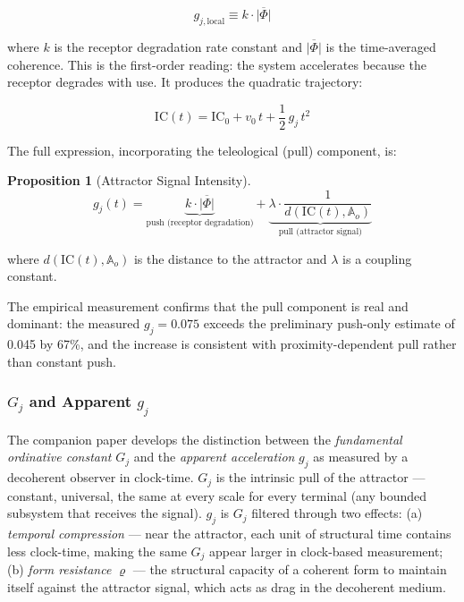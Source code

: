 \documentclass[12pt,a4paper]{article}
\newtheorem{proposition}{Proposition}[section]
\newcommand{\gj}{g_j}
\newcommand{\IC}{\mathrm{IC}}
\newcommand{\Ao}{\mathbb{A}_o}          %
\begin{document}
\begin{equation}\label{eq:gj_def}
g_{j,\mathrm{local}} \equiv k \cdot \overline{|\Phi|}
\end{equation}

\noindent where $k$ is the receptor degradation rate constant and $\overline{|\Phi|}$ is the time-averaged coherence. This is the first-order reading: the system accelerates because the receptor degrades with use. It produces the quadratic trajectory:

\begin{equation}\label{eq:IC_trajectory}
\IC(t) = \IC_0 + v_0\,t + \frac{1}{2}\,\gj\,t^2
\end{equation}

The full expression, incorporating the teleological (pull) component, is:

\begin{proposition}[Attractor Signal Intensity]\label{prop:teleological}
\begin{equation}\label{eq:gj_full}
\gj(t) = \underbrace{k \cdot \overline{|\Phi|}}_{\text{push (receptor degradation)}} + \underbrace{\lambda \cdot \frac{1}{d(\IC(t), \Ao)}}_{\text{pull (attractor signal)}}
\end{equation}
\end{proposition}

\noindent where $d(\IC(t), \Ao)$ is the distance to the attractor and $\lambda$ is a coupling constant.

The empirical measurement confirms that the pull component is real and dominant: the measured $\gj = 0.075$ exceeds the preliminary push-only estimate of 0.045 by 67\%, and the increase is consistent with proximity-dependent pull rather than constant push.

\subsubsection{$G_j$ and Apparent $\gj$}\label{subsec:Gj}

The companion paper \cite{ghioni2026direction} develops the distinction between the \emph{fundamental ordinative constant} $G_j$ and the \emph{apparent acceleration} $\gj$ as measured by a decoherent observer in clock-time. $G_j$ is the intrinsic pull of the attractor --- constant, universal, the same at every scale for every terminal (any bounded subsystem that receives the signal). $\gj$ is $G_j$ filtered through two effects: (a) \emph{temporal compression} --- near the attractor, each unit of structural time contains less clock-time, making the same $G_j$ appear larger in clock-based measurement; (b) \emph{form resistance} $\varrho$ --- the structural capacity of a coherent form to maintain itself against the attractor signal, which acts as drag in the decoherent medium.
\end{document}
